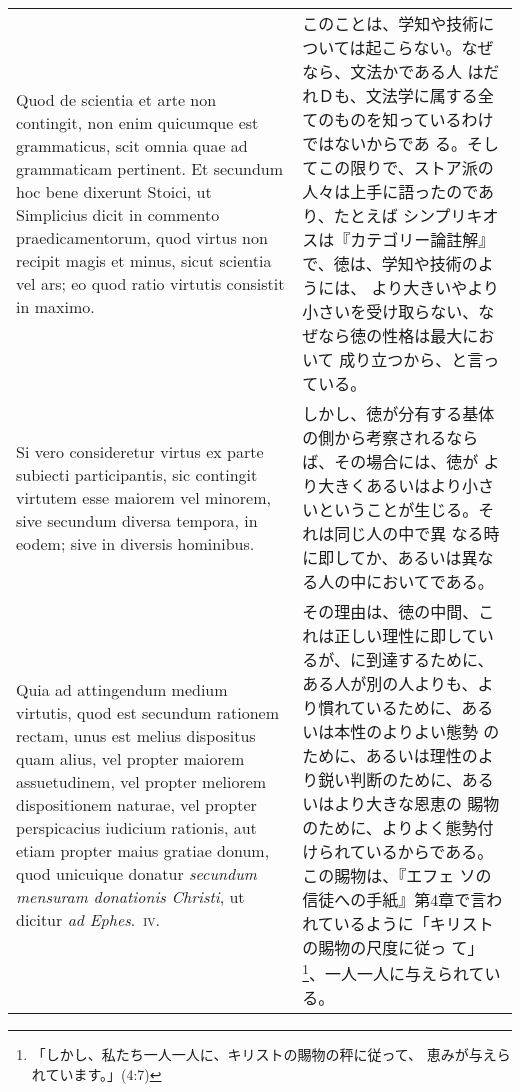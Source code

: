 \documentclass[10pt]{jsarticle}
\begin{document}
\begin{longtable}{p{21em}p{21em}}
\\

 Quod de scientia et arte non contingit, non enim quicumque
 est grammaticus, scit omnia quae ad grammaticam pertinent. Et
 secundum hoc bene dixerunt Stoici, ut Simplicius dicit in commento
 praedicamentorum, quod virtus non recipit magis et minus, sicut
 scientia vel ars; eo quod ratio virtutis consistit in maximo.
 
&

 このことは、学知や技術については起こらない。なぜなら、文法かである人
 はだれＤも、文法学に属する全てのものを知っているわけではないからであ
 る。そしてこの限りで、ストア派の人々は上手に語ったのであり、たとえば
 シンプリキオスは『カテゴリー論註解』で、徳は、学知や技術のようには、
 より大きいやより小さいを受け取らない、なぜなら徳の性格は最大において
 成り立つから、と言っている。

\\

 Si vero
 consideretur virtus ex parte subiecti participantis, sic contingit
 virtutem esse maiorem vel minorem, sive secundum diversa tempora, in
 eodem; sive in diversis hominibus.
 
&

 しかし、徳が分有する基体の側から考察されるならば、その場合には、徳が
 より大きくあるいはより小さいということが生じる。それは同じ人の中で異
 なる時に即してか、あるいは異なる人の中においてである。

\\

 Quia ad attingendum medium virtutis, quod est secundum rationem
 rectam, unus est melius dispositus quam alius, vel propter maiorem
 assuetudinem, vel propter meliorem dispositionem naturae, vel propter
 perspicacius iudicium rationis, aut etiam propter maius gratiae
 donum, quod unicuique donatur {\itshape secundum mensuram donationis
 Christi}, ut dicitur {\itshape ad Ephes}.~{\scshape iv}.
 
&

その理由は、徳の中間、これは正しい理性に即しているが、に到達するために、
ある人が別の人よりも、より慣れているために、あるいは本性のよりよい態勢
のために、あるいは理性のより鋭い判断のために、あるいはより大きな恩恵の
賜物のために、よりよく態勢付けられているからである。この賜物は、『エフェ
ソの信徒への手紙』第4章で言われているように「キリストの賜物の尺度に従っ
て」\footnote{「しかし、私たち一人一人に、キリストの賜物の秤に従って、
恵みが与えられています。」(4:7)}、一人一人に与えられている。


\\



\end{longtable}
\end{document}
